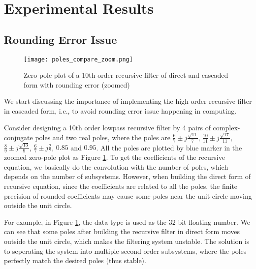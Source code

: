 \section{Experimental Results}
\label{sec:experiment}

\subsection{Rounding Error Issue}

\begin{figure}[t]
    \centerline{\texttt{[image: poles\_compare\_zoom.png]}}
    \caption{Zero-pole plot of a 10th order recursive filter of direct and cascaded form with rounding error (zoomed)}
    \label{fig:poles_compare_zoom}
\end{figure}

We start discussing the importance of implementing the high order recursive filter in cascaded form, i.e.,
to avoid rounding error issue happening in computing. 

Consider designing a 10th order lowpass recursive filter by 4 pairs of complex-conjugate poles and two real poles, where the poles are
$\frac{6}{7} \pm j\frac{\sqrt{11}}{7}$, $\frac{10}{11} \pm j\frac{\sqrt{17}}{11}$, $\frac{8}{9} \pm j\frac{\sqrt{13}}{9}$, $\frac{6}{7} \pm j\frac{2}{7}$,
$0.85$ and $0.95$. 
All the poles are plotted by blue marker
in the zoomed zero-pole plot as Figure \ref{fig:poles_compare_zoom}.
To get the coefficients of the recursive equation, we basically do the convolution with the number of poles, which depends on
the number of subsystems. 
However,
when building the direct form of recursive equation,
since the coefficients are related to all the poles,
the finite precision of rounded coefficients
may cause some poles near the unit circle moving outside the unit circle.

For example, in Figure \ref{fig:poles_compare_zoom}, the data type 
is used as the 32-bit floating number.
We can see that some poles after building the recursive filter in direct form 
moves outside the unit circle, which makes the filtering system unstable.
The solution is to seperating the system into multiple second order subsystems,
where the poles perfectly match the desired poles (thus stable).

